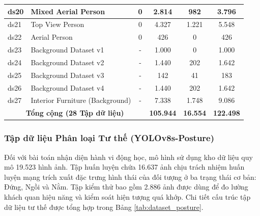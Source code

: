\begin{table}[H]
\begin{tabularx}{\textwidth}{|l|X|c|c|c|c|}
    ds20 & Mixed Aerial Person & 0 & 2.814 & 982 & 3.796 \\ \hline
    ds21 & Top View Person & 0 & 4.327 & 1.221 & 5.548 \\ \hline
    ds22 & Aerial Person & 0 & 426 & 0 & 426 \\ \hline
    ds23 & Background Dataset v1 & - & 1.000 & 0 & 1.000 \\ \hline
    ds24 & Background Dataset v2 & - & 1.440 & 202 & 1.642 \\ \hline
    ds25 & Background Dataset v3 & - & 142 & 41 & 183 \\ \hline
    ds26 & Background Dataset v4 & - & 1.440 & 202 & 1.642 \\ \hline
    ds27 & Interior Furniture (Background) & - & 7.338 & 1.748 & 9.086 \\ \hline
    \multicolumn{3}{|c|}{\textbf{Tổng cộng (28 Tập dữ liệu)}} & \textbf{105.944} & \textbf{16.554} & \textbf{122.498} \\ \hline
    \end{tabularx}
    \label{tab:dataset_rescue}
\end{table}

\subsubsection{Tập dữ liệu Phân loại Tư thế (YOLOv8s-Posture)}

Đối với bài toán nhận diện hành vi động học, mô hình sử dụng kho dữ liệu quy mô 19.523 hình ảnh. Tập huấn luyện chứa 16.637 ảnh chịu trách nhiệm huấn luyện mạng trích xuất đặc trưng hình thái của đối tượng ở ba trạng thái cơ bản: Đứng, Ngồi và Nằm. Tập kiểm thử bao gồm 2.886 ảnh được dùng để đo lường khách quan hiệu năng và kiểm soát hiện tượng quá khớp. Chi tiết cấu trúc tập dữ liệu tư thế được tổng hợp trong Bảng \ref{tab:dataset_posture}.

